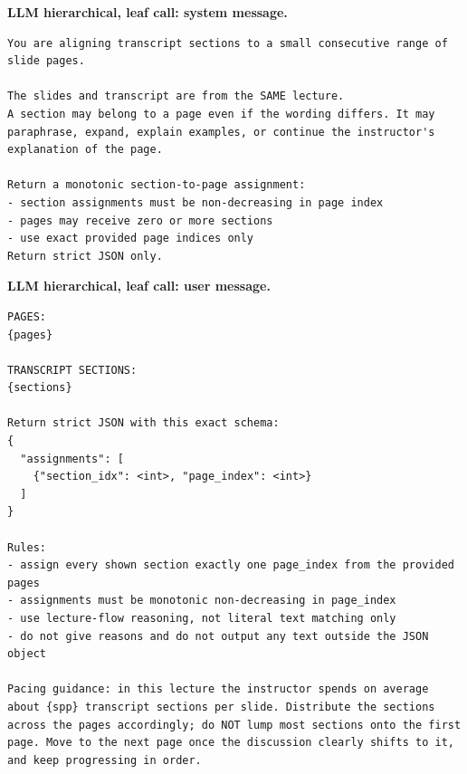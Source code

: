 \par\medskip\noindent\textbf{LLM hierarchical, leaf call: system message.}\par\nobreak
\begin{lstlisting}
You are aligning transcript sections to a small consecutive range of slide pages.

The slides and transcript are from the SAME lecture.
A section may belong to a page even if the wording differs. It may paraphrase, expand, explain examples, or continue the instructor's explanation of the page.

Return a monotonic section-to-page assignment:
- section assignments must be non-decreasing in page index
- pages may receive zero or more sections
- use exact provided page indices only
Return strict JSON only.
\end{lstlisting}

\par\medskip\noindent\textbf{LLM hierarchical, leaf call: user message.}\par\nobreak
\begin{lstlisting}
PAGES:
{pages}

TRANSCRIPT SECTIONS:
{sections}

Return strict JSON with this exact schema:
{
  "assignments": [
    {"section_idx": <int>, "page_index": <int>}
  ]
}

Rules:
- assign every shown section exactly one page_index from the provided pages
- assignments must be monotonic non-decreasing in page_index
- use lecture-flow reasoning, not literal text matching only
- do not give reasons and do not output any text outside the JSON object

Pacing guidance: in this lecture the instructor spends on average about {spp} transcript sections per slide. Distribute the sections across the pages accordingly; do NOT lump most sections onto the first page. Move to the next page once the discussion clearly shifts to it, and keep progressing in order.
\end{lstlisting}
